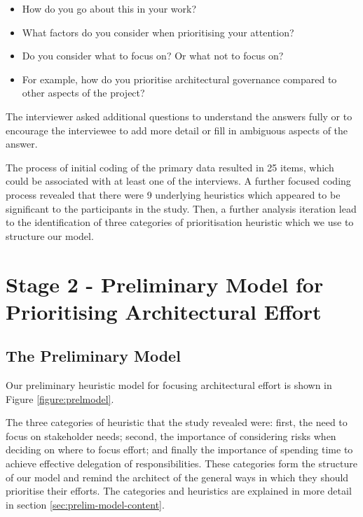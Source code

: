 \begin{itemize}
	\item How do you go about this in your work? 
	\item What factors do you consider when prioritising your attention? 
	\item Do you consider what to focus on?   Or what not to focus on? 
	\item For example, how do you prioritise architectural governance compared to other aspects of the project?
\end{itemize}

The interviewer asked additional questions to understand the answers fully or to encourage the interviewee to add more detail or fill in ambiguous aspects of the answer.

The process of initial coding of the primary data resulted in 25 items, which could be associated with at least one of the interviews.  A further focused coding process revealed that there were 9 underlying heuristics which appeared to be significant to the participants in the study. Then, a further analysis iteration lead to the identification of three categories of prioritisation heuristic which we use to structure our model.

\section{Stage 2 - Preliminary Model for Prioritising Architectural Effort}
\label{section:prelim-model}

\subsection{The Preliminary Model}

Our preliminary heuristic model for focusing architectural effort is shown in Figure \ref{figure:prelmodel}.
 
The three categories of heuristic that the study revealed were: first, the need to focus on stakeholder needs; second, the importance of considering risks when deciding on where to focus effort; and finally the importance of spending time to achieve effective delegation of responsibilities.  These categories form the structure of our model and remind the architect of the general ways in which they should prioritise their efforts. The categories and heuristics are explained in more detail in section \ref{sec:prelim-model-content}.

